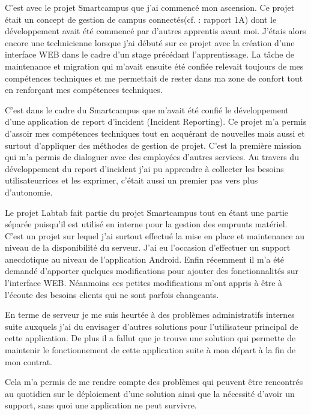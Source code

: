 \documentclass[french,12pt,a4paper,titlepage,openright,openbib]{report}
\begin{document}
C'est avec le projet Smartcampus que j'ai commencé mon ascension. Ce projet était un concept de gestion de campus connectés(cf. : rapport 1A) dont le développement avait été commencé par d'autres apprentis avant moi. J'étais alors encore une technicienne lorsque j'ai débuté sur ce projet avec la création d'une interface WEB dans le cadre d'un stage précédant l'apprentissage.
La tâche de maintenance et migration qui m'avait ensuite été confiée relevait toujours de mes compétences techniques et me permettait de rester dans ma zone de confort tout en renforçant mes compétences techniques.

C'est dans le cadre du Smartcampus que m'avait été confié le développement d'une application de report d'incident (Incident Reporting). Ce projet m'a permis d'assoir mes compétences techniques tout en acquérant de nouvelles mais aussi et surtout d'appliquer des méthodes de gestion de projet. C'est la première mission qui m'a permis de dialoguer avec des employé\textperiodcentered e\textperiodcentered s d'autres services. Au travers du développement du report d'incident j'ai pu apprendre à collecter les besoins utilisateur\textperiodcentered rice\textperiodcentered s et les exprimer, c'était aussi un premier pas vers plus d'autonomie.

Le projet Labtab fait partie du projet Smartcampus tout en étant une partie séparée puisqu'il est utilisé en interne pour la gestion des emprunts matériel. C'est un projet sur lequel j'ai surtout effectué la mise en place et maintenance au niveau de la disponibilité du serveur.
J'ai eu l'occasion d'effectuer un support anecdotique au niveau de l'application Android. Enfin récemment il m'a été demandé d'apporter quelques modifications pour ajouter des fonctionnalités sur l'interface WEB. Néanmoins ces petites modifications m'ont appris à être à l'écoute des besoins clients qui ne sont parfois changeants.

En terme de serveur je me suis heurtée à des problèmes administratifs internes suite auxquels j'ai du envisager d'autres solutions pour l'utilisateur principal de cette application. De plus il a fallut que je trouve une solution qui permette de maintenir le fonctionnement de cette application suite à mon départ à la fin de mon contrat. 

Cela m'a permis de me rendre compte des problèmes qui peuvent être rencontrés au quotidien sur le déploiement d'une solution ainsi que la nécessité d'avoir un support, sans quoi une application ne peut survivre.
\end{document}
